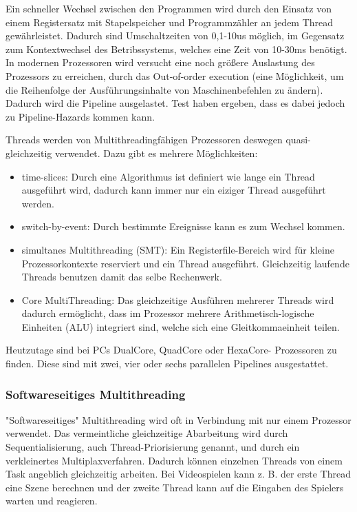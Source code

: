 \documentclass[12pt,a4paper]{report}
\begin{document}
\begin{onehalfspace}
Ein schneller Wechsel zwischen den Programmen wird durch den Einsatz von einem Registersatz mit Stapelspeicher und Programmzähler an jedem Thread gewährleistet. Dadurch sind Umschaltzeiten von 0,1-10us möglich, im Gegensatz zum Kontextwechsel des Betribssystems, welches eine Zeit von 10-30ms benötigt.\\

In modernen Prozessoren wird versucht eine noch größere Auslastung des Prozessors zu erreichen, durch das Out-of-order execution (eine Möglichkeit, um die Reihenfolge der Ausführungsinhalte von Maschinenbefehlen zu ändern). Dadurch wird die Pipeline ausgelastet. Test haben ergeben, dass es dabei jedoch zu Pipeline-Hazards kommen kann.

Threads werden von Multithreadingfähigen Prozessoren deswegen quasi-gleichzeitig verwendet. Dazu gibt es mehrere Möglichkeiten:
\begin{itemize}
\item time-slices: Durch eine Algorithmus ist definiert wie lange ein Thread ausgeführt wird, dadurch kann immer nur ein eiziger Thread ausgeführt werden.
\item switch-by-event: Durch bestimmte Ereignisse kann es zum Wechsel kommen.
\item simultanes Multithreading (SMT): Ein Registerfile-Bereich wird für kleine Prozessorkontexte reserviert und ein Thread ausgeführt. Gleichzeitig laufende Threads benutzen damit das selbe Rechenwerk.
\item Core MultiThreading: Das gleichzeitige Ausführen mehrerer Threads wird dadurch ermöglicht, dass im Prozessor mehrere Arithmetisch-logische Einheiten (ALU) integriert sind, welche sich eine Gleitkommaeinheit teilen.
\end{itemize}
Heutzutage sind bei PCs DualCore, QuadCore oder HexaCore- Prozessoren zu finden. Diese sind mit zwei, vier oder sechs parallelen Pipelines ausgestattet.


\subsubsection{Softwareseitiges Multithreading}
"{}Softwareseitiges"{} Multithreading wird oft in Verbindung mit nur einem Prozessor verwendet. Das vermeintliche gleichzeitige Abarbeitung wird durch Sequentialisierung, auch Thread-Priorisierung genannt, und durch ein verkleinertes Multiplaxverfahren. Dadurch können einzelnen Threads von einem Task angeblich gleichzeitig arbeiten. Bei Videospielen kann z. B. der erste Thread eine Szene berechnen und der zweite Thread kann auf die Eingaben des Spielers warten und reagieren.\\


\end{onehalfspace}
\end{document}
